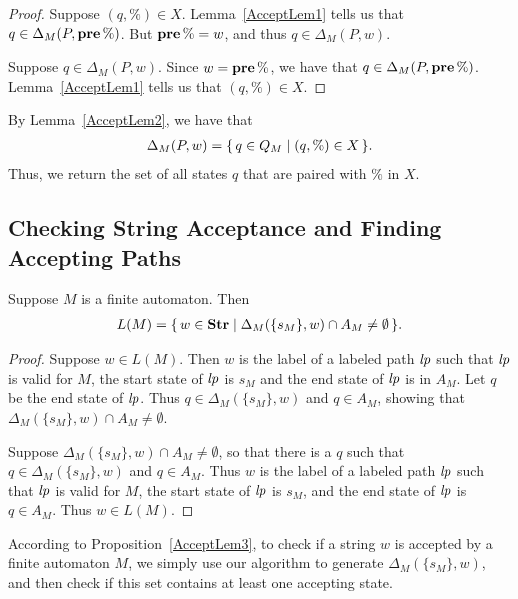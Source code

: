 \begin{proof}
Suppose $(q,\%)\in X$.  Lemma~\ref{AcceptLem1} tells us that
$q\in\Delta_M(P,\mathbf{pre}\,\%)$.  But $\mathbf{pre}\,\%=w$, and thus
$q\in\Delta_M(P,w)$.

Suppose $q\in\Delta_M(P,w)$.  Since $w=\mathbf{pre}\,\%$, we have that
$q\in\Delta_M(P,\mathbf{pre}\,\%)$.  Lemma~\ref{AcceptLem1} tells us that
$(q,\%)\in X$.
\end{proof}

By Lemma~\ref{AcceptLem2}, we have that
\begin{gather*}
\Delta_M(P,w)=\{ \, q\in Q_M \mid (q,\%)\in X \, \} .
\end{gather*}
Thus, we return the set of all states $q$ that are paired with $\%$ in
$X$.

\subsection{Checking String Acceptance and Finding Accepting Paths}

\begin{proposition}
\label{AcceptLem3}
Suppose $M$ is a finite automaton.  Then
\begin{gather*}
L(M) = \setof{w\in\Str}{\Delta_M(\{s_M\}, w)
\index{L(.)@$L(\cdot)$}%
\index{finite automaton!L(.)@$L(\cdot)$}%
\index{finite automaton!L characterizing@$L(\cdot)$!characterizing}%
\mathbin{\cap}A_M\mathrel{\neq}\emptyset} .
\end{gather*}
\end{proposition}

\begin{proof}
Suppose $w\in L(M)$.  Then $w$ is the label of a labeled path ${\it lp}$
such that ${\it lp}$ is valid for $M$, the start state of ${\it lp}$ is $s_M$ and
the end state of ${\it lp}$ is in $A_M$.  Let $q$ be the end state of
${\it lp}$.  Thus $q\in\Delta_M(\{s_M\}, w)$ and $q\in A_M$, showing that
$\Delta_M(\{s_M\}, w)\cap A_M\neq\emptyset$.

Suppose $\Delta_M(\{s_M\}, w)\cap A_M\neq\emptyset$, so that
there is a $q$ such that $q\in\Delta_M(\{s_M\}, w)$ and
$q\in A_M$.  Thus $w$ is the label of a labeled path ${\it lp}$ such that
${\it lp}$ is valid for $M$, the start state of ${\it lp}$ is $s_M$,
and the end state of ${\it lp}$ is $q\in A_M$.  Thus $w\in L(M)$.
\end{proof}

According to Proposition~\ref{AcceptLem3}, to check if a string $w$ is
accepted by a finite automaton $M$, we simply 
use our algorithm to generate $\Delta_M(\{s_M\}, w)$,
and then check if this set contains at least one accepting state.

